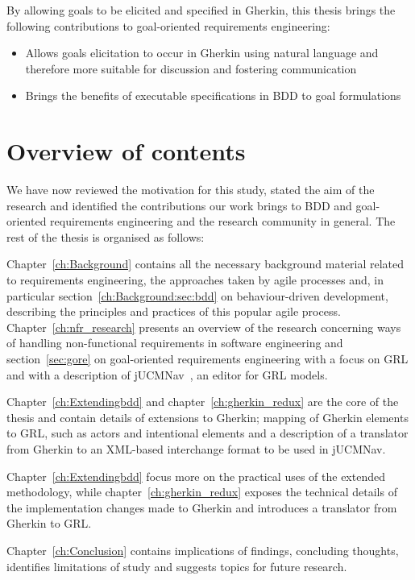 \documentclass[dissertation,final]{softeng}
\begin{document}
{By allowing goals to be elicited and specified in Gherkin, this thesis brings the following contributions to goal-oriented requirements engineering:

\begin{center}
\begin{itemize}
\item Allows goals elicitation to occur in Gherkin using natural language and therefore more suitable for discussion and fostering communication
\item Brings the benefits of executable specifications in BDD to goal formulations
\end{itemize}
\end{center}


\section{Overview of contents}

We have now reviewed the motivation for this study, stated the aim of the research and identified the contributions our work brings to BDD and goal-oriented requirements engineering and the research community in general. The rest of the thesis is organised as follows:

Chapter~\ref{ch:Background} contains all the necessary background material related to requirements engineering, the approaches taken by agile processes and, in particular section~\ref{ch:Background:sec:bdd} on behaviour-driven development, describing the principles and practices of this popular agile process. Chapter~\ref{ch:nfr_research} presents an overview of the research concerning ways of handling non-functional requirements in software engineering and section~\ref{sec:gore} on goal-oriented requirements engineering with a focus on GRL and with a description of jUCMNav~\citep{Amyot2010}, an editor for GRL models.

Chapter~\ref{ch:Extendingbdd} and chapter~\ref{ch:gherkin_redux} are the core of the thesis and contain details of extensions to Gherkin; mapping of Gherkin elements to GRL, such as actors and intentional elements and a description of a translator from Gherkin to an XML-based interchange format to be used in jUCMNav.

Chapter~\ref{ch:Extendingbdd} focus more on the practical uses of the extended methodology, while chapter~\ref{ch:gherkin_redux} exposes the technical details of the implementation changes made to Gherkin and introduces a translator from Gherkin to GRL.

Chapter~\ref{ch:Conclusion} contains implications of findings, concluding thoughts, identifies limitations of study and suggests topics for future research.
}
\end{document}
